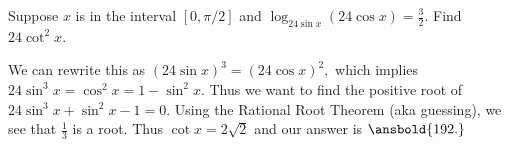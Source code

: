 \begin{exam}[AIME I 2011/9]
Suppose $x$ is in the interval $[0, \pi/2]$ and $\log_{24\sin x} (24\cos x)=\frac{3}{2}$. Find $24\cot^2 x$.
\end{exam}

\begin{sol}
We can rewrite this as $(24\sin x)^3=(24\cos x)^2,$ which implies $24\sin^3 x=\cos^2 x=1-\sin^2 x.$ Thus we want to find the positive root of $24\sin^3 x+\sin^2 x-1=0.$ Using the Rational Root Theorem (aka guessing), we see that $\frac{1}{3}$ is a root. Thus $\cot x=2\sqrt{2}$ and our answer is $\ansbold{192.}$\end{sol}
